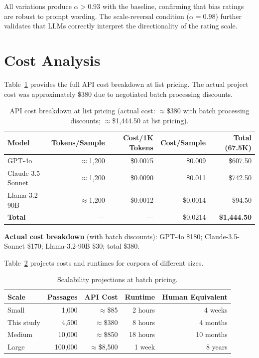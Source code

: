 \documentclass[10pt,letterpaper]{article}
\begin{document}
All variations produce $\alpha > 0.93$ with the baseline, confirming that bias
ratings are robust to prompt wording.  The scale-reversal condition ($\alpha = 0.98$)
further validates that LLMs correctly interpret the directionality of the rating
scale.

\section{Cost Analysis}
\label{app:cost}

Table~\ref{tab:cost_breakdown} provides the full API cost breakdown at list
pricing.  The actual project cost was approximately \$380 due to negotiated
batch processing discounts.

\begin{table}[h]
\centering
\caption{API cost breakdown at list pricing (actual cost: $\approx$\$380 with
batch processing discounts; $\approx$\$1,444.50 at list pricing).}
\label{tab:cost_breakdown}
\begin{tabular}{lrrrr}
\toprule
\textbf{Model} & \textbf{Tokens/Sample} & \textbf{Cost/1K Tokens} & \textbf{Cost/Sample} & \textbf{Total (67.5K)} \\
\midrule
GPT-4o            & $\approx$1,200 & \$0.0075 & \$0.009   & \$607.50 \\
Claude-3.5-Sonnet & $\approx$1,200 & \$0.0090 & \$0.011   & \$742.50 \\
Llama-3.2-90B     & $\approx$1,200 & \$0.0012 & \$0.0014  & \$94.50  \\
\midrule
\textbf{Total}    & ---            & ---      & \$0.0214  & \textbf{\$1,444.50} \\
\bottomrule
\end{tabular}
\end{table}

\noindent\textbf{Actual cost breakdown} (with batch discounts): GPT-4o \$180;
Claude-3.5-Sonnet \$170; Llama-3.2-90B \$30; total \$380.

Table~\ref{tab:scalability} projects costs and runtimes for corpora of different
sizes.

\begin{table}[h]
\centering
\caption{Scalability projections at batch pricing.}
\label{tab:scalability}
\begin{tabular}{lrrrr}
\toprule
\textbf{Scale} & \textbf{Passages} & \textbf{API Cost} & \textbf{Runtime} & \textbf{Human Equivalent} \\
\midrule
Small        & 1,000  & $\approx$\$85  & 2 hours  & 4 weeks   \\
This study   & 4,500  & $\approx$\$380 & 8 hours  & 4 months  \\
Medium       & 10,000 & $\approx$\$850 & 18 hours & 10 months \\
Large        & 100,000 & $\approx$\$8,500 & 1 week & 8 years  \\
\bottomrule
\end{tabular}
\end{table}
\end{document}
